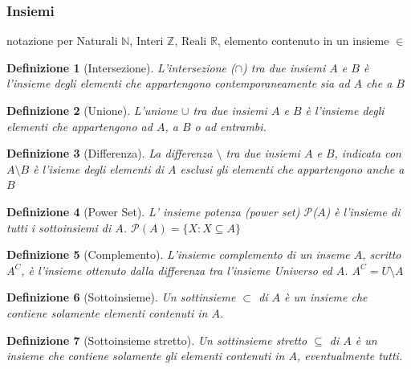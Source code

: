 \documentclass[a4paper]{article}
\newtheorem*{definition}{Definizione}
\begin{document}
\subsubsection{Insiemi}
notazione per Naturali $ \mathbb{N} $, Interi $ \mathbb{Z} $, Reali $ \mathbb{R} $, elemento contenuto in un insieme $ \in $
\newline
\begin{definition}[Intersezione]L'intersezione ($\cap$) tra due insiemi $A$ e $B$ è l'insieme degli elementi che appartengono contemporaneamente sia ad $A$ che a $B$
\end{definition}
\begin{definition}[Unione]L'unione $\cup$ tra due insiemi $A$ e $B$ è l'insieme degli elementi che appartengono ad $A$, a $B$ o ad entrambi.
\end{definition}
\begin{definition}[Differenza]La differenza $\setminus$ tra due insiemi $A$ e $B$, indicata con $A \setminus B$ è l'isieme degli elementi di $A$ esclusi gli elementi che appartengono anche a $B$
\end{definition}
\begin{definition}[Power Set]L' insieme potenza (power set) $\mathcal{P}$($A$) è l'insieme di tutti i sottoinsiemi di $A$. $\mathcal{P}(A)=\{X : X \subseteq A\}$ 
\end{definition}
\begin{definition}[Complemento]L'insieme complemento di un inseme $A$, scritto $A^{C}$, è l'insieme ottenuto dalla differenza tra l'insieme Universo ed $A$. $A^{C} = U \setminus A$
\end{definition}
\begin{definition}[Sottoinsieme]Un sottinsieme $ \subset $ di $A$ è un insieme che contiene solamente elementi contenuti in $A$.
\end{definition}
\begin{definition}[Sottoinsieme stretto]Un sottinsieme stretto $ \subseteq $  di $A$ è un insieme che contiene solamente gli elementi contenuti in $A$, eventualmente tutti.
\end{definition}
\end{document}
